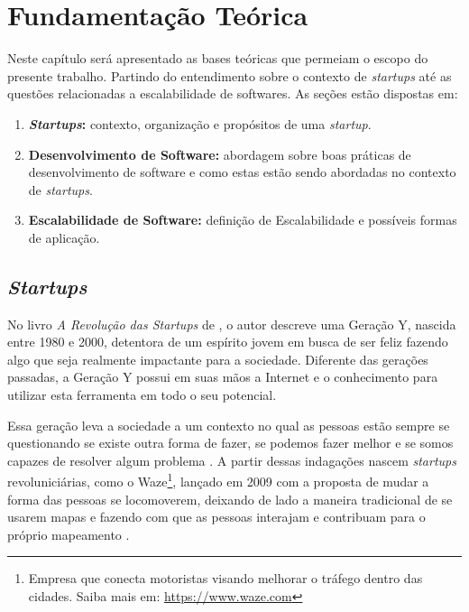 \chapter[Fundamentação Teórica]{Fundamentação Teórica}

Neste capítulo será apresentado as bases teóricas que permeiam o escopo
do presente trabalho. Partindo do entendimento sobre o contexto de
\textit{startups} até as questões relacionadas a escalabilidade de softwares.
As seções estão dispostas em:

  \begin{enumerate}
    \item \textbf{\textit{Startups}:} contexto, organização e propósitos de uma 
      \textit{startup}.
    \item \textbf{Desenvolvimento de Software:} abordagem sobre boas práticas
    de desenvolvimento de software e como estas estão sendo abordadas no contexto
    de \textit{startups}.
    \item \textbf{Escalabilidade de Software:} definição de Escalabilidade e 
      possíveis formas de aplicação.
  \end{enumerate}

\section{\textit{Startups}}

No livro \textit{A Revolução das Startups} de ,
o autor descreve uma Geração Y, nascida entre 1980 e 2000, detentora de um
espírito jovem em busca de ser feliz fazendo algo que seja realmente
impactante para a sociedade. Diferente das gerações passadas, a Geração Y
possui em suas mãos a Internet e o conhecimento para utilizar esta
ferramenta em todo o seu potencial.

Essa geração leva a sociedade a um contexto no qual as pessoas estão sempre
se questionando se existe outra forma de fazer, se podemos fazer melhor e
se somos capazes de resolver algum problema \cite{ARevolucaoDasStartups}.
A partir dessas indagações nascem \textit{startups} revoluniciárias, como
o Waze\footnote{Empresa que conecta motoristas visando melhorar o tráfego
dentro das cidades. Saiba mais em: \url{https://www.waze.com}}, lançado em
2009 com a proposta de mudar a forma das pessoas se locomoverem, deixando 
de lado a maneira tradicional de se usarem mapas e fazendo com que as 
pessoas interajam e contribuam para o próprio mapeamento
\cite{NepomucenoSucessoDoWaze}.

